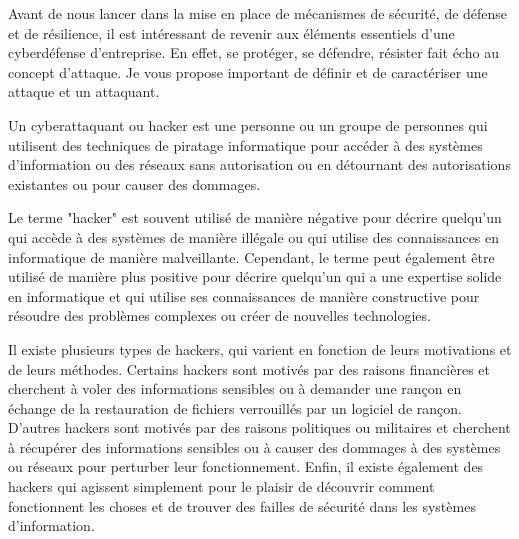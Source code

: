 %
%


Avant de nous lancer dans la mise en place de mécanismes de sécurité, de défense et de résilience, il est intéressant de revenir aux éléments essentiels d'une cyberdéfense d'entreprise. En effet, se protéger, se défendre, résister fait écho au concept d'attaque. Je vous propose important de définir et de caractériser une attaque et un attaquant. 

\utocomplete

Un cyberattaquant ou hacker est une personne ou un groupe de personnes qui utilisent des techniques de piratage informatique pour accéder à des systèmes d'information ou des réseaux sans autorisation ou en détournant des autorisations existantes ou pour causer des dommages.
 
Le terme "hacker" est souvent utilisé de manière négative pour décrire quelqu'un qui accède à des systèmes de manière illégale ou qui utilise des connaissances en informatique de manière malveillante. Cependant, le terme peut également être utilisé de manière plus positive pour décrire quelqu'un qui a une expertise solide en informatique et qui utilise ses connaissances de manière constructive pour résoudre des problèmes complexes ou créer de nouvelles technologies.

Il existe plusieurs types de hackers, qui varient en fonction de leurs motivations et de leurs méthodes. Certains hackers sont motivés par des raisons financières et cherchent à voler des informations sensibles ou à demander une rançon en échange de la restauration de fichiers verrouillés par un logiciel de rançon. D'autres hackers sont motivés par des raisons politiques ou militaires et cherchent à récupérer des informations sensibles ou à causer des dommages à des systèmes ou réseaux pour perturber leur fonctionnement. Enfin, il existe également des hackers qui agissent simplement pour le plaisir de découvrir comment fonctionnent les choses et de trouver des failles de sécurité dans les systèmes d'information.